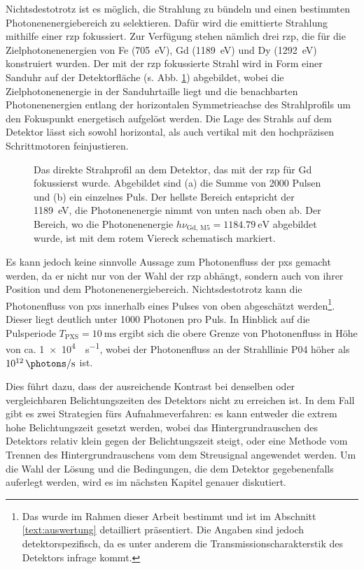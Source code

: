\noindent
Nichtsdestotrotz ist es möglich, die Strahlung zu bündeln und einen bestimmten Photonenenergiebereich zu selektieren. Dafür wird die emittierte Strahlung mithilfe einer \gls{rzp} fokussiert. Zur Verfügung stehen nämlich drei \gls{rzp}, die für die Zielphotonenenergien von Fe (\SI{705}{\eV}), Gd (\SI{1189}{\eV}) und Dy (\SI{1292}{\eV}) konstruiert wurden. Der mit der \gls{rzp} fokussierte Strahl wird in Form einer Sanduhr auf der Detektorfläche (s. Abb. \ref{fig:butterfly_moench}) abgebildet, wobei die Zielphotonenenergie in der Sanduhrtaille liegt und die benachbarten Photonenenergien entlang der horizontalen Symmetrieachse des Strahlprofils um den Fokuspunkt energetisch aufgelöst werden. Die Lage des Strahls auf dem Detektor lässt sich sowohl horizontal, als auch vertikal mit den hochpräzisen Schrittmotoren feinjustieren.
\begin{figure}[H]
    \centering
    \subfloat[]{\label{fig:butterfly_moench_sum}}
    \hfill
    \subfloat[]{\label{fig:butterfly_moench_single_shot}}
    \caption{Das direkte Strahprofil an dem Detektor, das mit der \gls{rzp} für Gd fokussierst wurde. Abgebildet sind (a) die Summe von 2000 Pulsen und (b) ein einzelnes Puls. Der hellste Bereich entspricht der \SI{1189}{\eV}, die Photonenenergie nimmt von unten nach oben ab. Der Bereich, wo die Photonenenergie $h\nu_{\text{Gd, M5}} = \SI{1184,79}{\eV}$ abgebildet wurde, ist mit dem rotem Viereck schematisch markiert.}
    \label{fig:butterfly_moench}
\end{figure}
\noindent
Es kann jedoch keine sinnvolle Aussage zum Photonenfluss der \gls{pxs} gemacht werden, da er nicht nur von der Wahl der \gls{rzp} abhängt, sondern auch von ihrer Position und dem  Photonenenergiebereich. Nichtsdestotrotz kann die Photonenfluss von \gls{pxs} innerhalb eines Pulses von oben abgeschätzt werden\footnote[2]{\label{footnote:einschub_in_auswertung} Das wurde im Rahmen dieser Arbeit bestimmt und ist im Abschnitt \ref{text:auswertung} detailliert präsentiert. Die Angaben sind jedoch detektorspezifisch, da es unter anderem die Transmissionscharakterstik des Detektors infrage kommt.}. Dieser liegt deutlich unter 1000 Photonen pro Puls. In Hinblick auf die Pulsperiode $T_\text{PXS}=\SI{10}{\milli\second}$ ergibt sich die obere Grenze von Photonenfluss in Höhe von ca. \SI{1e4}{\photons\per\second}, wobei der Photonenfluss an der Strahllinie P04 höher als $\SI{1e12}{\photons\per\second}$ ist.

\noindent
Dies führt dazu, dass der ausreichende Kontrast bei denselben oder vergleichbaren Belichtungszeiten des Detektors nicht zu erreichen ist. In dem Fall gibt es zwei Strategien fürs Aufnahmeverfahren: es kann entweder die extrem hohe Belichtungszeit gesetzt werden, wobei das Hintergrundrauschen des Detektors relativ klein gegen der Belichtungszeit steigt, oder eine Methode vom Trennen des Hintergrundrauschens vom dem Streusignal angewendet werden. Um die Wahl der Lösung und die Bedingungen, die dem Detektor gegebenenfalls auferlegt werden, wird es im nächsten Kapitel genauer diskutiert.